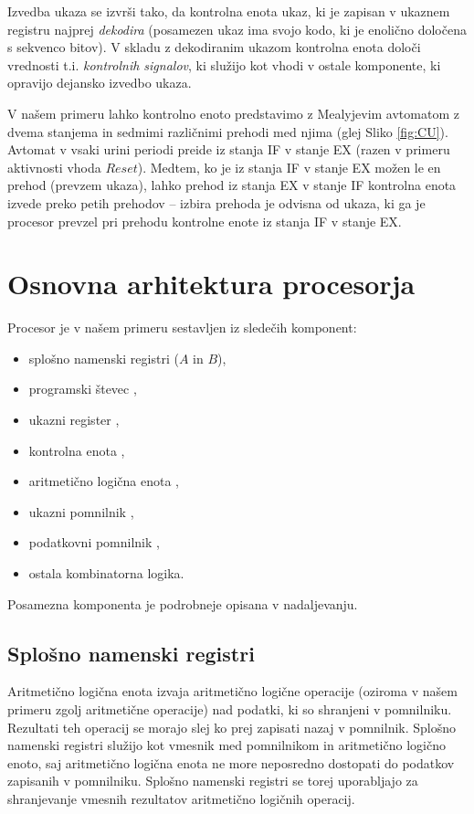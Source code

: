Izvedba ukaza se izvrši tako, da kontrolna enota ukaz, ki je zapisan v ukaznem registru najprej \emph{dekodira} (posamezen ukaz ima svojo kodo, ki je enolično določena s sekvenco bitov). V skladu z dekodiranim ukazom kontrolna enota določi vrednosti t.i. \emph{kontrolnih signalov}, ki služijo kot vhodi v ostale komponente, ki opravijo dejansko izvedbo ukaza. 

V našem primeru lahko kontrolno enoto predstavimo z Mealyjevim avtomatom z dvema stanjema in sedmimi različnimi prehodi med njima (glej Sliko \ref{fig:CU}). Avtomat v vsaki urini periodi preide iz stanja IF v stanje EX (razen v primeru aktivnosti vhoda $Reset$). Medtem, ko je iz stanja IF v stanje EX možen le en prehod (prevzem ukaza), lahko prehod iz stanja EX v stanje IF kontrolna enota izvede preko petih prehodov -- izbira prehoda je odvisna od ukaza, ki ga je procesor prevzel pri prehodu kontrolne enote iz stanja IF v stanje EX. 

\section{Osnovna arhitektura procesorja}
Procesor je v našem primeru sestavljen iz sledečih komponent:
\begin{itemize}
\item splošno namenski registri ($A$ in $B$),
\item programski števec ,
\item ukazni register ,
\item kontrolna enota ,
\item aritmetično logična enota ,
\item ukazni pomnilnik ,
\item podatkovni pomnilnik ,
\item ostala kombinatorna logika.
\end{itemize}
Posamezna komponenta je podrobneje opisana v nadaljevanju.

\subsection{Splošno namenski registri}
Aritmetično logična enota izvaja aritmetično logične operacije (oziroma v našem primeru zgolj aritmetične operacije) nad podatki, ki so shranjeni v pomnilniku. Rezultati teh operacij se morajo slej ko prej zapisati nazaj v pomnilnik. Splošno namenski registri služijo kot vmesnik med pomnilnikom in aritmetično logično enoto, saj aritmetično logična enota ne more neposredno dostopati do podatkov zapisanih v pomnilniku. Splošno namenski registri se torej uporabljajo za shranjevanje vmesnih rezultatov aritmetično logičnih operacij.

